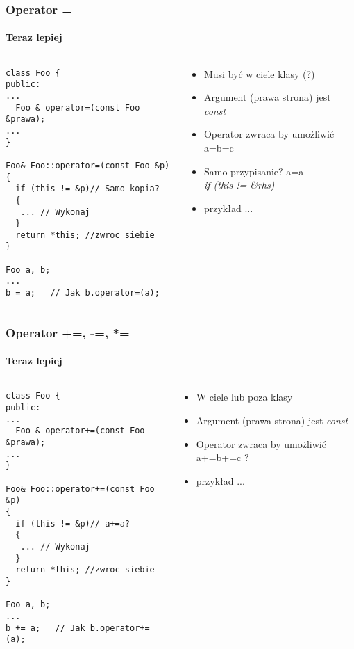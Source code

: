 \documentclass[10pt]{beamer}
\begin{document}
\begin{frame}[fragile]
  \frametitle{Operator =}
  \framesubtitle{Teraz lepiej}
  
  \begin{columns}
    \begin{column}{0.48\textwidth}
\begin{lstlisting}
class Foo {
public:
...
  Foo & operator=(const Foo &prawa);
...
}

Foo& Foo::operator=(const Foo &p)
{
  if (this != &p)// Samo kopia?
  {
   ... // Wykonaj
  }
  return *this; //zwroc siebie
}

Foo a, b;
...
b = a;   // Jak b.operator=(a);
\end{lstlisting}
    \end{column}
    \begin{column}{0.48\textwidth}
      \begin{itemize}
        \item Musi być w ciele klasy (?)
        \item Argument (prawa strona) jest \textit{const}
        \item Operator zwraca by umożliwić a=b=c
        \item Samo przypisanie? a=a\\
        \textit{if (this != \&rhs)}
        \item przykład ...
      \end{itemize}
    \end{column}
  \end{columns}
  
\end{frame}

\begin{frame}[fragile]
  \frametitle{Operator +=, -=, *=}
  \framesubtitle{Teraz lepiej}
  
  \begin{columns}
    \begin{column}{0.48\textwidth}
\begin{lstlisting}
class Foo {
public:
...
  Foo & operator+=(const Foo &prawa);
...
}

Foo& Foo::operator+=(const Foo &p)
{
  if (this != &p)// a+=a?
  {
   ... // Wykonaj
  }
  return *this; //zwroc siebie
}

Foo a, b;
...
b += a;   // Jak b.operator+=(a);
\end{lstlisting}
    \end{column}
    \begin{column}{0.48\textwidth}
      \begin{itemize}
        \item W ciele lub poza klasy
        \item Argument (prawa strona) jest \textit{const}
        \item Operator zwraca by umożliwić a+=b+=c ?
        \item przykład ...
      \end{itemize}
    \end{column}
  \end{columns}
  
\end{frame}
\end{document}
